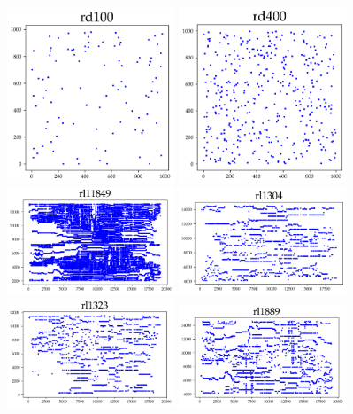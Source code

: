 \begin{appendices}
\begin{figure}[htbp]
\centering
\includegraphics[width=5cm]{../tsplib_euc2d_pictures_of_instances/rd100.png}
\includegraphics[width=5cm]{../tsplib_euc2d_pictures_of_instances/rd400.png}
\includegraphics[width=5cm]{../tsplib_euc2d_pictures_of_instances/rl11849.png}
\includegraphics[width=5cm]{../tsplib_euc2d_pictures_of_instances/rl1304.png}
\includegraphics[width=5cm]{../tsplib_euc2d_pictures_of_instances/rl1323.png}
\includegraphics[width=5cm]{../tsplib_euc2d_pictures_of_instances/rl1889.png}

\end{figure}
\end{appendices}
